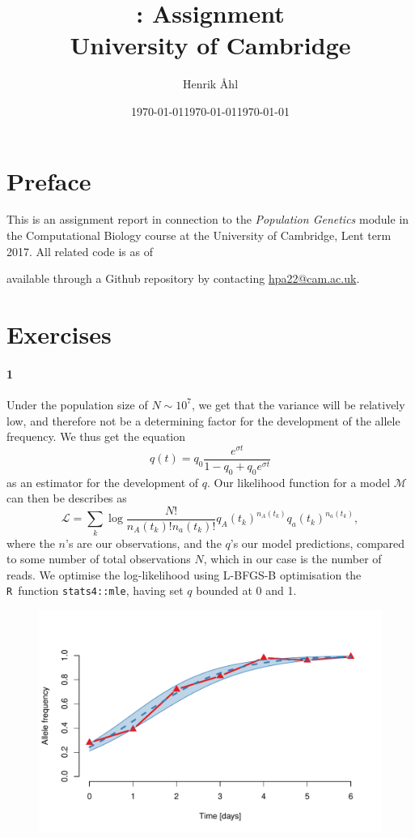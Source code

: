 \documentclass[10pt]{article}\usepackage[]{graphicx}\usepackage[]{color}
\title{
  \bf \course: Assignment \ass \\[1em]
  \small{University of Cambridge}
}
\author{Henrik Åhl}
\date{\today}
\makeatletter
\def\maxwidth{ %
  \ifdim\Gin@nat@width>\linewidth
    \linewidth
  \else
    \Gin@nat@width
  \fi
}
\theoremstyle{plain}
\newcommand{\R}{\texttt{R}}
\newcommand{\course}{Population Genetics}
\newcommand{\term}{Lent term 2017}
\makeatother
\begin{document}
\date{\today}
\maketitle
\setcounter{page}{1}


\maketitle

\begin{multicols*}{2}
\section*{Preface}
This is an assignment report in connection to the \textit{\course}
module in the Computational Biology course at the University of Cambridge,
\term. All related code is as of \date{\today} available through a
Github repository by contacting \href{mailto:hpa22@cam.ac.uk}{hpa22@cam.ac.uk}.

\section*{Exercises}
\paragraph*{1}
Under the population size of $N \sim 10^7$, we get that the variance will be relatively low, and therefore not be a determining factor for the development of the allele frequency. We thus get the equation $$q(t) = q_{0} \dfrac{e^{\sigma t}}{1 - q_0 + q_0 e^{\sigma t}}$$ as an estimator for the development of $q$. Our likelihood function for a model $\mathcal M$ can then be describes as $$ \mathcal L = \sum_k \log \dfrac{N!}{n_A(t_k)! n_a(t_k)!}q_A(t_k)^{n_A(t_k)}q_a(t_k)^{n_a(t_k)},$$ where the $n$'s are our observations, and the $q$'s our model predictions, compared to some number of total observations $N$, which in our case is the number of reads. We optimise the log-likelihood using L-BFGS-B optimisation the \R~function \texttt{stats4::mle}, having set $q$ bounded at 0 and 1. 



\begin{Schunk}
\begin{figure}[H]

{\centering \includegraphics[width=\maxwidth]{figure/twocolumn-1_inference-1} 

}
\end{figure}
\end{Schunk}
\end{multicols*}
\end{document}
